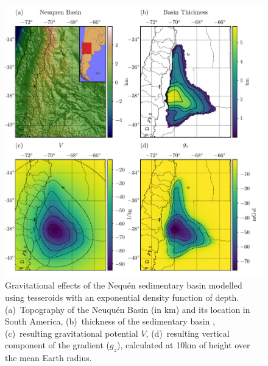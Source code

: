 \documentclass[extra, referee]{gji}
\begin{document}
\begin{figure}
\centering
\includegraphics[width=\linewidth]{figures/neuquen-basin.pdf}
\caption{
    Gravitational effects of the Nequ\'en sedimentary basin modelled
    using tesseroids with an exponential density function of depth.
    (a)~Topography of the Neuqu\'en Basin (in km) and its location in South America,
    (b)~thickness of the sedimentary basin \citep[in meters;][]{Heine2007},
    (c)~resulting gravitational potential $V$,
    (d)~resulting vertical component of the gradient ($g_z$),
    calculated at 10km of height over the mean Earth radius.
}
\label{fig:neuquen-basin}
\end{figure}
\end{document}
